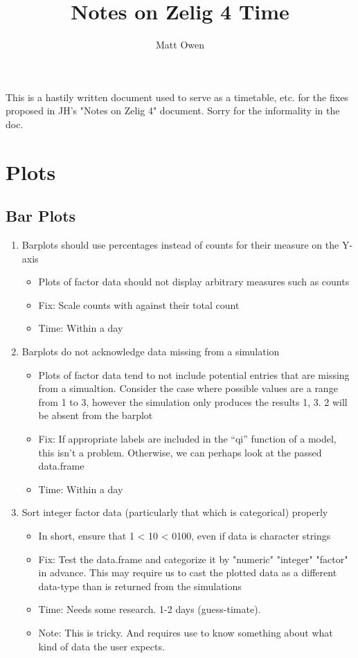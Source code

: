 \documentclass{article}
\title{Notes on Zelig 4 Time}
\author{Matt Owen}
\begin{document}
This is a hastily written document used to serve as a timetable, etc. for the fixes proposed in JH's "Notes on Zelig 4" document. Sorry for the informality in the doc.

\section{Plots}

\subsection{Bar Plots}

\begin{enumerate}
  \item Barplots should use percentages instead of counts for their measure on the Y-axis \begin{itemize}
      \item Plots of factor data should not display arbitrary measures such as counts
      \item Fix: Scale counts with against their total count
      \item Time: Within a day
    \end{itemize}

  \item Barplots do not acknowledge data missing from a simulation  \begin{itemize}
      \item Plots of factor data tend to not include potential entries that are missing from a simualtion. Consider the case where possible values are a range from 1 to 3, however
        the simulation only produces the results {1, 3}. 2 will be absent from the barplot
      \item Fix: If appropriate labels are included in the ``qi'' function of a model, this isn't a problem. Otherwise, we can perhaps look at the passed data.frame
      \item Time: Within a day
    \end{itemize}

  \item Sort integer factor data (particularly that which is categorical) properly \begin{itemize}
      \item In short, ensure that 1 < 10 < 0100, even if data is character strings
      \item Fix: Test the data.frame and categorize it by "numeric" "integer" "factor" in advance. This may require us to cast the plotted data as a different data-type than is returned from the simulations
      \item Time: Needs some research. 1-2 days (guess-timate).
      \item Note: This is tricky. And requires use to know something about what kind of data the user expects.
    \end{itemize}
\end{enumerate}
\end{document}
